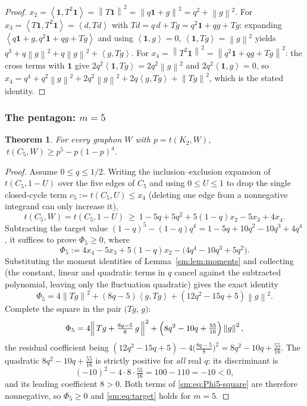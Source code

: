 \documentclass[11pt]{article}
\newtheorem{theorem}{Theorem}[section]
\theoremstyle{remark}
\theoremstyle{plain}
\theoremstyle{plain}
\newcommand{\one}{\mathbf 1}
\newcommand{\ip}[2]{\left\langle #1,#2\right\rangle}
\newcommand{\norm}[1]{\left\|#1\right\|}
\begin{document}
\begin{proof}
$x_2=\ip{\one}{T^2\one}=\norm{T\one}^2=\norm{q\one+g}^2=q^2+\norm{g}^2$.
For $x_3=\ip{T\one}{T^2\one}=\ip{d}{Td}$ with
$Td=q\,d+Tg=q^2\one+qg+Tg$: expanding
$\ip{q\one+g}{q^2\one+qg+Tg}$ and using $\ip{\one}{g}=0$,
$\ip{\one}{Tg}=\norm{g}^2$ yields
$q^3+q\norm{g}^2+q\norm{g}^2+\ip{g}{Tg}$.
For $x_4=\norm{T^2\one}^2=\norm{q^2\one+qg+Tg}^2$: the cross terms with $\one$
give $2q^2\ip{\one}{Tg}=2q^2\norm{g}^2$ and $2q^2\ip{\one}{g}=0$, so
$x_4=q^4+q^2\norm{g}^2+2q^2\norm{g}^2+2q\ip{g}{Tg}+\norm{Tg}^2$,
which is the stated identity.
\end{proof}

\subsubsection{The pentagon: \texorpdfstring{$m=5$}{m=5}}\label{sm:sub:C5}

\begin{theorem}\label{sm:thm:C5}
For every graphon $W$ with $p=t(K_2,W)$,
$\ t(C_5,W)\ge p^{5}-p(1-p)^{4}.$
\end{theorem}

\begin{proof}
Assume $0\le q\le1/2$.  Writing the inclusion--exclusion expansion of
$t(C_5,1-U)$ over the five edges of $C_5$ and using $0\le U\le1$ to drop the
single closed-cycle term $c_5:=t(C_5,U)\le x_4$ (deleting one edge from a
nonnegative integrand can only increase it),
\[
   t(C_5,W)=t(C_5,1-U)
   \ \ge\ 1-5q+5q^{2}+5(1-q)x_2-5x_3+4x_4 .
\]
Subtracting the target value
$(1-q)^5-(1-q)q^4=1-5q+10q^{2}-10q^{3}+4q^{4}$, it suffices to prove
$\Phi_5\ge0$, where
\begin{equation}\label{sm:eq:Phi5}
   \Phi_5:=4x_4-5x_3+5(1-q)x_2-\bigl(4q^{4}-10q^{3}+5q^{2}\bigr).
\end{equation}
Substituting the moment identities of Lemma~\ref{sm:lem:moments} and
collecting (the constant, linear and quadratic terms in $q$ cancel against the
subtracted polynomial, leaving only the fluctuation quadratic) gives the exact
identity
\begin{equation}\label{sm:eq:Phi5-collected}
   \Phi_5=4\norm{Tg}^{2}+(8q-5)\ip{g}{Tg}+(12q^{2}-15q+5)\norm{g}^{2}.
\end{equation}
Complete the square in the pair $\bigl(Tg,\,g\bigr)$:
\begin{equation}\label{sm:eq:Phi5-square}
   \Phi_5=4\Bigl\|\,Tg+\tfrac{8q-5}{8}\,g\,\Bigr\|^{2}
          +\Bigl(8q^{2}-10q+\tfrac{55}{16}\Bigr)\norm{g}^{2},
\end{equation}
the residual coefficient being
$(12q^{2}-15q+5)-4\bigl(\tfrac{8q-5}{8}\bigr)^{2}
   =8q^{2}-10q+\tfrac{55}{16}$.
The quadratic $8q^{2}-10q+\tfrac{55}{16}$ is strictly positive for
\emph{all} real $q$: its discriminant is
\[
   (-10)^{2}-4\cdot 8\cdot\tfrac{55}{16}=100-110=-10<0,
\]
and its leading coefficient $8>0$.  Both terms of
\eqref{sm:eq:Phi5-square} are therefore nonnegative, so $\Phi_5\ge0$ and
\eqref{sm:eq:target} holds for $m=5$.
\end{proof}
\end{document}
